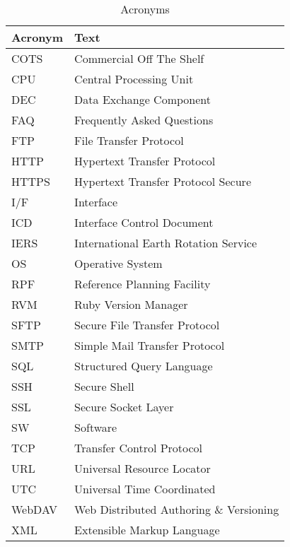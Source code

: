 \documentclass[dec_sum_main.tex]{subfiles}
\begin{document}
\begin{longtable}{|m{2.8cm}|m{10cm}|}
	\caption{Acronyms\label{long}} \\
    \hline
	\textbf{Acronym} & \textbf{Text} \\
	\hline
	COTS & Commercial Off The Shelf \\ \hline
	CPU & Central Processing Unit \\ \hline
	DEC & Data Exchange Component \\ \hline
	FAQ & Frequently Asked Questions \\ \hline
	FTP & File Transfer Protocol \\ \hline
	HTTP & Hypertext Transfer Protocol \\ \hline
	HTTPS & Hypertext Transfer Protocol Secure\\ \hline
	I/F & Interface \\ \hline
	ICD & Interface Control Document \\ \hline
	IERS & International Earth Rotation Service \\ \hline
	OS & Operative System \\ \hline
	RPF & Reference Planning Facility \\ \hline
	RVM & Ruby Version Manager \\ \hline
	SFTP & Secure File Transfer Protocol \\ \hline
	SMTP & Simple Mail Transfer Protocol \\ \hline
	SQL & Structured Query Language \\ \hline
	SSH & Secure Shell \\ \hline
	SSL & Secure Socket Layer \\ \hline
	SW & Software \\ \hline
	TCP & Transfer Control Protocol \\ \hline
	URL & Universal Resource Locator \\ \hline
	UTC & Universal Time Coordinated \\ \hline
	WebDAV & Web Distributed Authoring \& Versioning \\ \hline
	XML & Extensible Markup Language \\ \hline						
\end{longtable}
\end{document}

